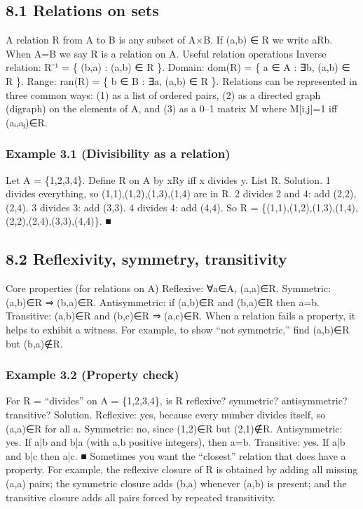 \documentclass[11pt]{article}
\begin{document}
\subsection{8.1 Relations on sets}
A relation R from A to B is any subset of A×B. If (a,b) ∈ R we write aRb. When A=B we say
R is a relation on A.
Useful relation operations
Inverse relation: R⁻¹ = \{ (b,a) : (a,b) ∈ R \}.
Domain: dom(R) = \{ a ∈ A : ∃b, (a,b) ∈ R \}.
Range: ran(R) = \{ b ∈ B : ∃a, (a,b) ∈ R \}.
Relations can be represented in three common ways: (1) as a list of ordered pairs, (2) as a
directed graph (digraph) on the elements of A, and (3) as a 0–1 matrix M where M[i,j]=1 iff
(aᵢ,aⱼ)∈R.

\subsubsection*{Example 3.1 (Divisibility as a relation)}
Let A = \{1,2,3,4\}. Define R on A by xRy iff x divides y. List R.
Solution. 1 divides everything, so (1,1),(1,2),(1,3),(1,4) are in R.
2 divides 2 and 4: add (2,2),(2,4).
3 divides 3: add (3,3).
4 divides 4: add (4,4).
So R = \{(1,1),(1,2),(1,3),(1,4),(2,2),(2,4),(3,3),(4,4)\}. ■
\subsection{8.2 Reflexivity, symmetry, transitivity}
Core properties (for relations on A)
Reflexive: ∀a∈A, (a,a)∈R.
Symmetric: (a,b)∈R ⇒ (b,a)∈R.
Antisymmetric: if (a,b)∈R and (b,a)∈R then a=b.
Transitive: (a,b)∈R and (b,c)∈R ⇒ (a,c)∈R.
When a relation fails a property, it helps to exhibit a witness. For example, to show “not
symmetric,” find (a,b)∈R but (b,a)∉R.
\subsubsection*{Example 3.2 (Property check)}
For R = “divides” on A = \{1,2,3,4\}, is R reflexive? symmetric? antisymmetric?
transitive?
Solution. Reflexive: yes, because every number divides itself, so (a,a)∈R for all a.
Symmetric: no, since (1,2)∈R but (2,1)∉R.
Antisymmetric: yes. If a|b and b|a (with a,b positive integers), then a=b.
Transitive: yes. If a|b and b|c then a|c. ■
Sometimes you want the “closest” relation that does have a property. For example, the
reflexive closure of R is obtained by adding all missing (a,a) pairs; the symmetric closure
adds (b,a) whenever (a,b) is present; and the transitive closure adds all pairs forced by
repeated transitivity.
\end{document}
